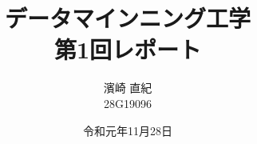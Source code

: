\documentclass[a4paper]{jsarticle}
\title{\Huge データマインニング工学\\\huge 第1回レポート\vspace{120mm}}
\author{\Large 濱崎 直紀\\\normalsize 28G19096\vspace{25mm}}
\date{令和元年11月28日}
\begin{document}
\begin{titlepage}
\maketitle
\thispagestyle{empty}
\end{titlepage}


\end{document}
